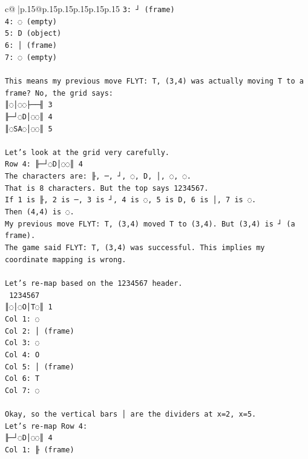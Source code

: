 \documentclass{article}
\begin{document}
{\begin{supertabular}{c@{$\;$}|p{.15\linewidth}@{}p{.15\linewidth}p{.15\linewidth}p{.15\linewidth}p{.15\linewidth}p{.15\linewidth}}
{{{\texttt{3: ┘ (frame)} \\
\texttt{4: ◌ (empty)} \\
\texttt{5: D (object)} \\
\texttt{6: │ (frame)} \\
\texttt{7: ◌ (empty)} \\
\\ 
\texttt{This means my previous move FLYT: T, (3,4) was actually moving T to a frame? No, the grid says:} \\
\texttt{║◌│◌◌├──╢ 3} \\
\texttt{╟─┘◌D│◌◌║ 4} \\
\texttt{║◌SA◌│◌◌║ 5} \\
\\ 
\texttt{Let's look at the grid very carefully.} \\
\texttt{Row 4: ╟─┘◌D│◌◌║ 4} \\
\texttt{The characters are: ╟, ─, ┘, ◌, D, │, ◌, ◌.} \\
\texttt{That is 8 characters. But the top says 1234567.} \\
\texttt{If 1 is ╟, 2 is ─, 3 is ┘, 4 is ◌, 5 is D, 6 is │, 7 is ◌.} \\
\texttt{Then (4,4) is ◌.} \\
\texttt{My previous move FLYT: T, (3,4) moved T to (3,4). But (3,4) is ┘ (a frame).} \\
\texttt{The game said FLYT: T, (3,4) was successful. This implies my coordinate mapping is wrong.} \\
\\ 
\texttt{Let's re{-}map based on the 1234567 header.} \\
\texttt{ 1234567} \\
\texttt{║◌│◌O│T◌║ 1} \\
\texttt{Col 1: ◌} \\
\texttt{Col 2: │ (frame)} \\
\texttt{Col 3: ◌} \\
\texttt{Col 4: O} \\
\texttt{Col 5: │ (frame)} \\
\texttt{Col 6: T} \\
\texttt{Col 7: ◌} \\
\\ 
\texttt{Okay, so the vertical bars │ are the dividers at x=2, x=5.} \\
\texttt{Let's re{-}map Row 4:} \\
\texttt{╟─┘◌D│◌◌║ 4} \\
\texttt{Col 1: ╟ (frame)} \\
}}}
\end{supertabular}}
\end{document}
